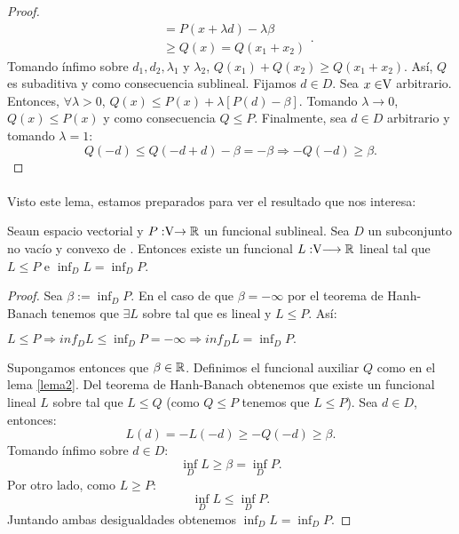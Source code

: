 \begin{proof}
\begin{equation*}
\begin{split}
		& = P(x +\lambda d) - \lambda \beta\\ 
		& \geq Q(x) = Q(x_1 + x_2)
		\end{split}.
		\end{equation*}
		Tomando ínfimo sobre $ d_1, d_2, \lambda_1 $ y $ \lambda_2 $, $  Q(x_1) + Q (x_2 ) \geq Q (x_1 + x_2 ) $. Así, $ Q $ es subaditiva y como consecuencia sublineal. Fijamos $ d \in D $. Sea $ x \in \vecSpace $ arbitrario. Entonces, $ \forall \lambda > 0 $, $ Q(x) \leq P(x) + \lambda \left[P(d) - \beta \right]$. Tomando $ \lambda \longrightarrow 0 $, $ Q(x) \leq P(x)$ y como consecuencia $ Q \leq P $. Finalmente, sea $ d \in D $ arbitrario y tomando $ \lambda = 1 $:
		\[Q(-d) \leq Q(-d+d) - \beta = -\beta \Longrightarrow  -Q(-d) \geq \beta.  \]
		
	\end{proof}

	\paragraph{}Visto este lema, estamos preparados para ver el resultado que nos interesa:
	
	\begin{teoremaBox}\label{M-O}
		Sea\vecSpace un espacio vectorial y $P:\vecSpace \rightarrow \RR$ un funcional sublineal.  Sea $ D $ un subconjunto no vacío y convexo de \vecSpace. Entonces existe un funcional $ L: \vecSpace \longrightarrow \RR $ lineal tal que $ L \leq P $ e $ \inf_D L = \inf_D P $.
	\end{teoremaBox}
	\begin{proof}
		Sea $ \beta := \inf_D P $. En el caso de que $ \beta = -\infty $ por el teorema de Hanh-Banach tenemos que $ \exists L $ sobre \vecSpace tal que es lineal y $ L \leq P$. Así:
		\begin{center}
			$ L \leq P \Longrightarrow inf_D L \leq \inf_D P = -\infty \Longrightarrow inf_D L = \inf_D P.$ 
		\end{center}
		Supongamos entonces que $ \beta \in \mathbb{R} $. Definimos el funcional auxiliar $ Q $ como en el lema \ref{lema2}. Del teorema de Hanh-Banach obtenemos que existe un funcional lineal $ L $ sobre \vecSpace tal que $ L \leq Q$ (como $ Q \leq P $ tenemos que $ L \leq P $). Sea $ d \in D $, entonces:
		\[
		L(d) = -L(-d) \geq -Q(-d) \geq \beta.
		\]
		Tomando ínfimo sobre $ d \in D $:
		\[
		\inf_D L \geq \beta = \inf_D P.
		\]
		Por otro lado, como $ L \geq P $:
		\[
		\inf_D L \leq\inf_D P.
		\]
		Juntando ambas desigualdades obtenemos $ \inf_D L =\inf_D P $.
	\end{proof}

